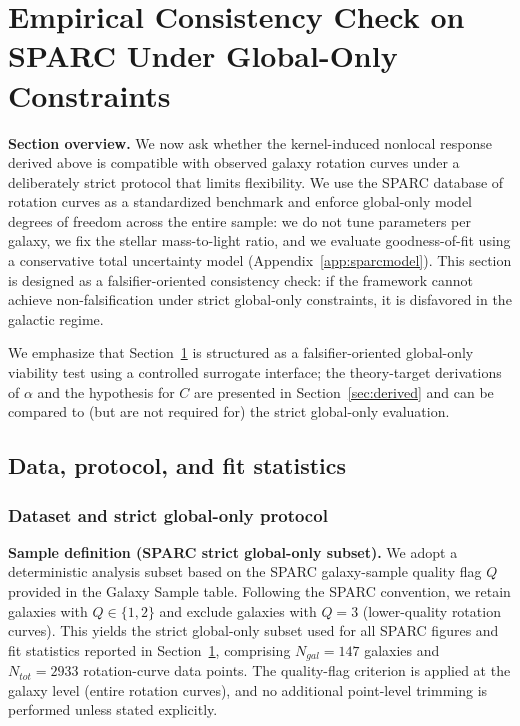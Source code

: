 \documentclass[entropy,article,submit,pdftex,moreauthors]{Definitions/mdpi}
\begin{document}
\section{Empirical Consistency Check on SPARC Under Global-Only Constraints}
\label{sec:sparc}

\textbf{Section overview.} We now ask whether the kernel-induced nonlocal response derived above is compatible with observed galaxy rotation curves under a deliberately strict protocol that limits flexibility. We use the SPARC database of rotation curves as a standardized benchmark and enforce global-only model degrees of freedom across the entire sample: we do not tune parameters per galaxy, we fix the stellar mass-to-light ratio, and we evaluate goodness-of-fit using a conservative total uncertainty model (Appendix~\ref{app:sparcmodel}). This section is designed as a falsifier-oriented consistency check: if the framework cannot achieve non-falsification under strict global-only constraints, it is disfavored in the galactic regime.

We emphasize that Section~\ref{sec:sparc} is structured as a falsifier-oriented global-only viability test using a controlled surrogate interface; the theory-target derivations of $\alpha$ and the hypothesis for $C$ are presented in Section~\ref{sec:derived} and can be compared to (but are not required for) the strict global-only evaluation.

\subsection{Data, protocol, and fit statistics}
\label{subsec:datasparc}

\subsubsection{Dataset and strict global-only protocol}

\textbf{Sample definition (SPARC strict global-only subset).} We adopt a deterministic analysis subset based on the SPARC galaxy-sample quality flag $Q$ provided in the Galaxy Sample table. Following the SPARC convention, we retain galaxies with $Q \in \{1,2\}$ and exclude galaxies with $Q=3$ (lower-quality rotation curves). This yields the strict global-only subset used for all SPARC figures and fit statistics reported in Section~\ref{sec:sparc}, comprising $N_{gal}=147$ galaxies and $N_{tot} = 2933$ rotation-curve data points. The quality-flag criterion is applied at the galaxy level (entire rotation curves), and no additional point-level trimming is performed unless stated explicitly.
\end{document}

